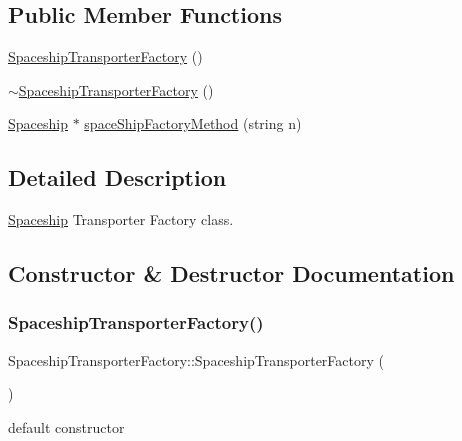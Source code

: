 \subsection*{Public Member Functions}
\begin{DoxyCompactItemize}
\item 
\hyperlink{classSpaceshipTransporterFactory_ad11fd5d05b2c26f7d06f20ed50b909e6}{Spaceship\+Transporter\+Factory} ()
\item 
\hyperlink{classSpaceshipTransporterFactory_ae212a0156eeb4517bc8e8f518971eec7}{$\sim$\+Spaceship\+Transporter\+Factory} ()
\item 
\hyperlink{classSpaceship}{Spaceship} $\ast$ \hyperlink{classSpaceshipTransporterFactory_a8bcd955724ffca8ffdc07d2ef1561d24}{space\+Ship\+Factory\+Method} (string n)
\end{DoxyCompactItemize}


\subsection{Detailed Description}
\hyperlink{classSpaceship}{Spaceship} Transporter Factory class. 

\subsection{Constructor \& Destructor Documentation}
\mbox{\label{classSpaceshipTransporterFactory_ad11fd5d05b2c26f7d06f20ed50b909e6}} 
\subsubsection{\texorpdfstring{Spaceship\+Transporter\+Factory()}{SpaceshipTransporterFactory()}}
{\footnotesize\ttfamily Spaceship\+Transporter\+Factory\+::\+Spaceship\+Transporter\+Factory (\begin{DoxyParamCaption}{ }\end{DoxyParamCaption})}

default constructor \mbox{\label{classSpaceshipTransporterFactory_ae212a0156eeb4517bc8e8f518971eec7}} 
